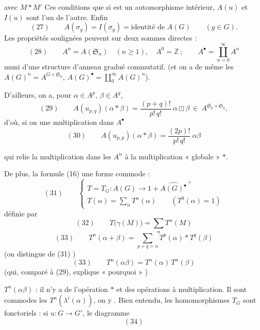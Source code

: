 \documentclass[11pt,a4paper]{article}
\begin{document}


\ill{} avec $M * M'$ \ill{} Ces conditions \ill{} que si \ill{} est un
automorphisme intérieur, $A(u)$ et $I(u)$ sont \ill{} l'un de l'autre. Enfin
\[ (27) \qquad A(\sigma_{g}) = I(\sigma_{g}) = \text{identité de } A(G)
   \qquad (g \in G) . \]
Les propriétés soulignées peuvent \ill{} sur deux sommes directes :
\[ (28) \qquad A^{n} = A(\mathfrak{S}_{n}) \quad (n \geq 1) , \quad
   A^{0} = \mathbb{Z} \ ; \qquad A^{\bullet} = \coprod_{n=0}^{\infty} A^{n} \]
muni d'une structure d'anneau gradué commutatif. \ill{} (et on a de même les
$A(G)^{n} = A^{G \times \mathfrak{S}_{n}}$, $A(G)^{\bullet} =
\coprod_{0}^{\infty} A(G)^{n}$).

D'ailleurs, on a, pour $\alpha \in A^{p}$, $\beta \in A^{q}$,
\[ (29) \qquad A(u_{p,q})(\alpha * \beta) = \frac{(p+q)!}{p!\, q!}\
   \alpha \boxdot \beta \ \in \ A^{\mathfrak{S}_{p} \times \mathfrak{S}_{q}} , \]
d'où, si on \ill{} une multiplication dans $A^{\bullet}$ \ill{}
\[ (30) \qquad A(u_{p,p})(\alpha * \beta) = \frac{(2p)!}{p!\, q!}\
   \alpha \beta \]


qui relie la multiplication dans les $A^{n}$ \struck{\ill{}} à la multiplication
« globale » $*$.

De plus, la formule (16) \ill{} une forme \ill{} commode :
\[ (31) \qquad \begin{cases}
   T = T_{G} : A(G) \longrightarrow 1 + \widehat{A(G)^{\bullet}}^{\,+} \\
   T(\alpha) = \sum_{n} T^{n}(\alpha) \qquad (T^{0}(\alpha) = 1)
\end{cases} \]
définie par
\[ (32) \qquad T\bigl(\gamma(M)\bigr) = \sum_{n} T^{n}(M) \]
\[ (33) \qquad T^{n}(\alpha + \beta) = \sum_{p+q=n} T^{p}(\alpha) * T^{q}(\beta) \]
(on distingue \ill{} de (31) \ill{})
\[ (33) \qquad T^{n}(\alpha \beta) = T^{n}(\alpha)\, T^{n}(\beta) \]
(qui, comparé à (29), explique « pourquoi » \ill{})



\ill{} $T^{n}(\alpha\beta)$ : il n'y a \ill{} de l'opération $*$ et des opérations
\ill{} à \ill{} multiplication. Il \ill{} sont commodes \ill{} les
$T^{n}(\lambda^{i}(\alpha))$, on y \uncertain{reviendra}. Bien entendu, les
homomorphismes $T_{G}$ sont \struck{\ill{}} fonctoriels : si $u : G \to G'$, le
diagramme
\[ (34) \]
\end{document}
